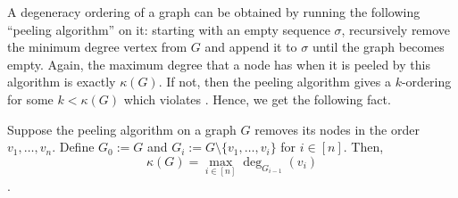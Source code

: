 A degeneracy ordering of a graph can be obtained by running the following ``peeling algorithm'' on it: starting with an empty sequence $\sigma$, recursively remove the minimum degree vertex from $G$ and append it to $\sigma$ until the graph becomes empty. Again, the maximum degree that a node has when it is peeled by this algorithm is exactly $\kappa(G)$. If not, then the peeling algorithm gives a $k$-ordering for some $k<\kappa(G)$ which violates . Hence, we get the following fact. 


 
  

\begin{fact}\label{fact:peelingmin-degen}
Suppose the peeling algorithm on a graph $G$ removes its nodes in the order $v_1,\ldots,v_n$. Define $G_0:=G$ and $G_i:= G\setminus \{v_1,\ldots,v_i\}$ for $i\in [n]$. Then, $$\kappa(G)=\max_{i\in [n]} \deg_{G_{i-1}}(v_i)$$. 
\end{fact}



